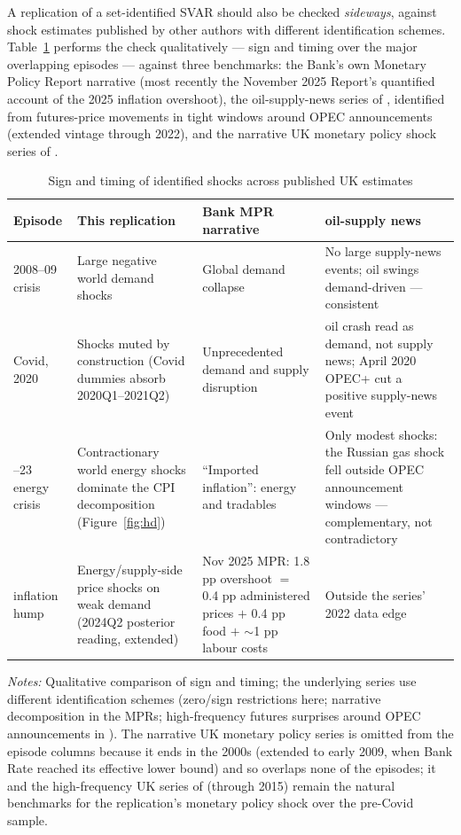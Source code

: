 A replication of a set-identified SVAR should also be checked \emph{sideways}, against shock estimates published by other authors with different identification schemes. Table~\ref{tab:shockcompare} performs the check qualitatively --- sign and timing over the major overlapping episodes --- against three benchmarks: the Bank's own Monetary Policy Report narrative (most recently the November 2025 Report's quantified account of the 2025 inflation overshoot), the oil-supply-news series of \citet{kanzig2021}, identified from futures-price movements in tight windows around OPEC announcements (extended vintage through 2022), and the narrative UK monetary policy shock series of \citet{cloyne2016}.

\begin{table}[t]
\centering
\caption{Sign and timing of identified shocks across published UK estimates}
\label{tab:shockcompare}
\footnotesize
\begin{tabularx}{\textwidth}{@{}l>{\raggedright\arraybackslash}X>{\raggedright\arraybackslash}X>{\raggedright\arraybackslash}X@{}}
\toprule
Episode & This replication & Bank MPR narrative & \citet{kanzig2021} oil-supply news \\
\midrule
2008--09 crisis & Large negative world demand shocks & Global demand collapse & No large supply-news events; oil swings demand-driven --- consistent \\
\addlinespace
Covid, 2020 & Shocks muted by construction (Covid dummies absorb 2020Q1--2021Q2) & Unprecedented demand and supply disruption & 2020 oil crash read as demand, not supply news; April 2020 OPEC+ cut a positive supply-news event \\
\addlinespace
2021--23 energy crisis & Contractionary world energy shocks dominate the CPI decomposition (Figure~\ref{fig:hd}) & ``Imported inflation'': energy and tradables & Only modest shocks: the Russian gas shock fell outside OPEC announcement windows --- complementary, not contradictory \\
\addlinespace
2025 inflation hump & Energy/supply-side price shocks on weak demand (2024Q2 posterior reading, extended) & Nov 2025 MPR: 1.8 pp overshoot $=$ 0.4 pp administered prices $+$ 0.4 pp food $+$ $\sim$1 pp labour costs & Outside the series' 2022 data edge \\
\bottomrule
\end{tabularx}
\par\smallskip
\parbox{0.97\textwidth}{\footnotesize \emph{Notes:} Qualitative comparison of sign and timing; the underlying series use different identification schemes (zero/sign restrictions here; narrative decomposition in the MPRs; high-frequency futures surprises around OPEC announcements in \citealp{kanzig2021}). The \citet{cloyne2016} narrative UK monetary policy series is omitted from the episode columns because it ends in the 2000s (extended to early 2009, when Bank Rate reached its effective lower bound) and so overlaps none of the episodes; it and the high-frequency UK series of \citet{cesabianchi2020} (through 2015) remain the natural benchmarks for the replication's monetary policy shock over the pre-Covid sample.}
\end{table}


